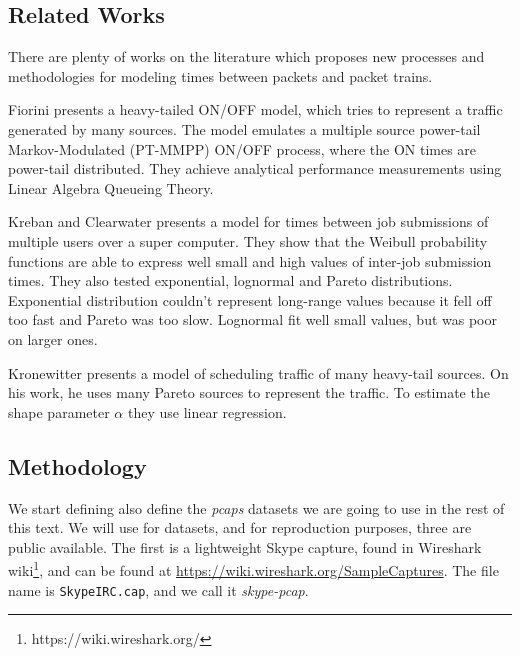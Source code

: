 \subsection{Related Works}

There are plenty of works on the literature which proposes new processes and methodologies for modeling times between packets and packet trains.

Fiorini \cite{modeling-concurrent-heavy-tailed} presents a heavy-tailed ON/OFF model, which tries to represent a traffic generated by many sources. The model emulates a multiple source power-tail Markov-Modulated (PT-MMPP) ON/OFF process, where the ON times are power-tail distributed. They achieve analytical performance measurements using Linear Algebra Queueing Theory.

Kreban and Clearwater\cite{hierarchical-dynamics-interarrival-times} presents a model for times between job submissions of multiple users over a super computer. They show that the Weibull probability functions are able to express well small and high values of inter-job submission times. They also tested exponential, lognormal and Pareto distributions. Exponential distribution couldn't  represent long-range values because it fell off too fast and Pareto was too slow. Lognormal fit well small values, but was poor on larger ones.    

Kronewitter\cite{optimal-scheduling-of-heavy-tailed-traffic} presents a model of scheduling traffic of many heavy-tail sources. On his work, he uses many Pareto sources to represent the traffic. To estimate the shape parameter $\alpha$ they use linear regression.

 

\subsection{Methodology}

We start defining also define the \textit{pcaps} datasets we are going to use in the rest of this text. We will use for datasets, and for reproduction purposes, three are public available. 
The first is a lightweight Skype capture, found in  Wireshark wiki\footnote{https://wiki.wireshark.org/}, and can be found at \href{https://wiki.wireshark.org/SampleCaptures}{https://wiki.wireshark.org/SampleCaptures}. The file name is \texttt{SkypeIRC.cap}, and we call it \textit{skype-pcap}.

